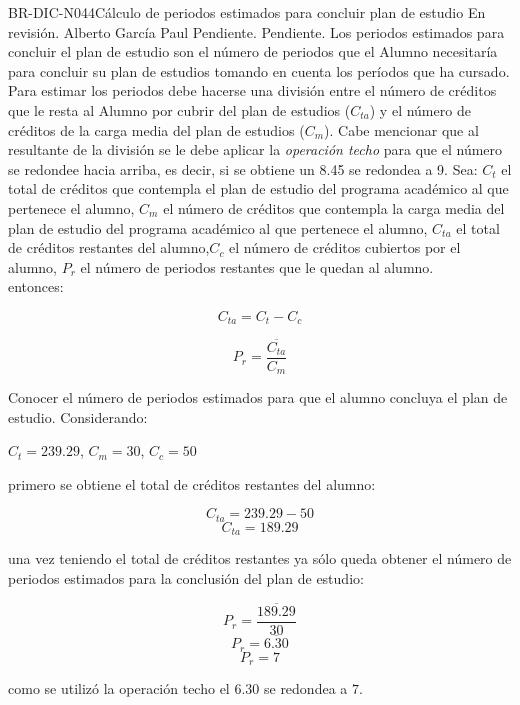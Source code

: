 \begin{BusinessRule}{BR-DIC-N044}{Cálculo de periodos estimados para concluir plan de estudio}
	{\bcCondition} %
	{\btTimer}     %
	{\blInfluencing}     %
	\BRItem[Estado] En revisión.
	  Alberto García Paul
	 Pendiente.
	 Pendiente.
	\BRItem[Descripción] Los periodos estimados para concluir el plan de estudio son el número de periodos que el Alumno necesitaría para concluir su plan de estudios tomando en cuenta los períodos que ha cursado. Para estimar los periodos debe hacerse una división entre el número de créditos que le resta al Alumno por cubrir del plan de estudios ($C_{ta}$) y el número de créditos de la carga media del plan de estudios ($C_{m}$). Cabe mencionar que al resultante de la división se le debe aplicar la \textit{operación techo} para que el número se redondee hacia arriba, es decir, si se obtiene un 8.45 se redondea a 9.
	\BRItem[Sentencia] \cdtEmpty
	Sea: $C_{t}$ el total de créditos que contempla el plan de estudio del programa académico al que pertenece el alumno, $C_{m}$ el número de créditos que contempla la carga media del plan de estudio del programa académico al que pertenece el alumno, $C_{ta}$ el total de créditos restantes del alumno,$C_{c}$ el número de créditos cubiertos por el alumno, $P_{r}$ el número de periodos restantes que le quedan al alumno. \\
	entonces: 
	\begin{center}
		\[C_{ta} = C_{t} - C_{c}\]
		
		\[P_{r} = \overline{\frac{C_{ta}}{C_{m}}} \]
	\end{center}
	\BRItem[Motivación] Conocer el número de periodos estimados para que el alumno concluya el plan de estudio.
	\BRItem[Ejemplo 1] \cdtEmpty
	Considerando: 
	\begin{center}
		$C_{t} = 239.29$, $C_{m} = 30$, $C_{c} = 50$
	\end{center}
	primero se obtiene el total de créditos restantes del alumno:
	\begin{center}
		\[C_{ta} = 239.29 - 50\] 
		\[C_{ta} = 189.29\]
	\end{center}
	una vez teniendo el total de créditos restantes ya sólo queda obtener el número de periodos estimados para la conclusión del plan de estudio:
	\begin{center}
		\[P_{r} = \overline{\frac{189.29}{30}}\] 
		\[P_{r} = \overline{6.30}\] 
		\[P_{r} = 7 \]
	\end{center}
	como se utilizó la operación techo el $6.30$ se redondea a $7$. 
	

\end{BusinessRule}
